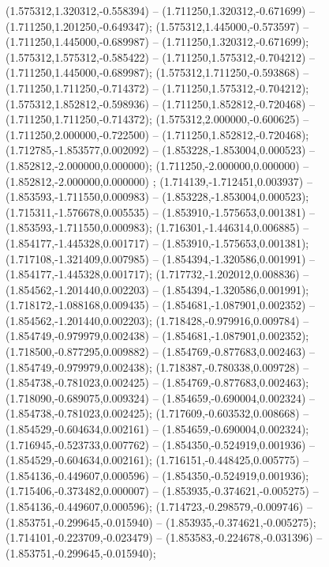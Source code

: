  (1.575312,1.320312,-0.558394) -- (1.711250,1.320312,-0.671699) -- (1.711250,1.201250,-0.649347);
 (1.575312,1.445000,-0.573597) -- (1.711250,1.445000,-0.689987) -- (1.711250,1.320312,-0.671699);
 (1.575312,1.575312,-0.585422) -- (1.711250,1.575312,-0.704212) -- (1.711250,1.445000,-0.689987);
 (1.575312,1.711250,-0.593868) -- (1.711250,1.711250,-0.714372) -- (1.711250,1.575312,-0.704212);
 (1.575312,1.852812,-0.598936) -- (1.711250,1.852812,-0.720468) -- (1.711250,1.711250,-0.714372);
 (1.575312,2.000000,-0.600625) -- (1.711250,2.000000,-0.722500) -- (1.711250,1.852812,-0.720468);
 (1.712785,-1.853577,0.002092) -- (1.853228,-1.853004,0.000523) -- (1.852812,-2.000000,0.000000);
 (1.711250,-2.000000,0.000000) -- (1.852812,-2.000000,0.000000) ;
 (1.714139,-1.712451,0.003937) -- (1.853593,-1.711550,0.000983) -- (1.853228,-1.853004,0.000523);
 (1.715311,-1.576678,0.005535) -- (1.853910,-1.575653,0.001381) -- (1.853593,-1.711550,0.000983);
 (1.716301,-1.446314,0.006885) -- (1.854177,-1.445328,0.001717) -- (1.853910,-1.575653,0.001381);
 (1.717108,-1.321409,0.007985) -- (1.854394,-1.320586,0.001991) -- (1.854177,-1.445328,0.001717);
 (1.717732,-1.202012,0.008836) -- (1.854562,-1.201440,0.002203) -- (1.854394,-1.320586,0.001991);
 (1.718172,-1.088168,0.009435) -- (1.854681,-1.087901,0.002352) -- (1.854562,-1.201440,0.002203);
 (1.718428,-0.979916,0.009784) -- (1.854749,-0.979979,0.002438) -- (1.854681,-1.087901,0.002352);
 (1.718500,-0.877295,0.009882) -- (1.854769,-0.877683,0.002463) -- (1.854749,-0.979979,0.002438);
 (1.718387,-0.780338,0.009728) -- (1.854738,-0.781023,0.002425) -- (1.854769,-0.877683,0.002463);
 (1.718090,-0.689075,0.009324) -- (1.854659,-0.690004,0.002324) -- (1.854738,-0.781023,0.002425);
 (1.717609,-0.603532,0.008668) -- (1.854529,-0.604634,0.002161) -- (1.854659,-0.690004,0.002324);
 (1.716945,-0.523733,0.007762) -- (1.854350,-0.524919,0.001936) -- (1.854529,-0.604634,0.002161);
 (1.716151,-0.448425,0.005775) -- (1.854136,-0.449607,0.000596) -- (1.854350,-0.524919,0.001936);
 (1.715406,-0.373482,0.000007) -- (1.853935,-0.374621,-0.005275) -- (1.854136,-0.449607,0.000596);
 (1.714723,-0.298579,-0.009746) -- (1.853751,-0.299645,-0.015940) -- (1.853935,-0.374621,-0.005275);
 (1.714101,-0.223709,-0.023479) -- (1.853583,-0.224678,-0.031396) -- (1.853751,-0.299645,-0.015940);
